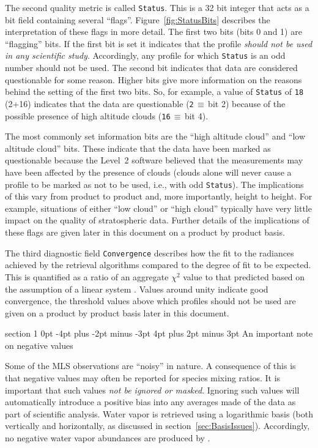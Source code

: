 \documentclass[11pt,draft]{report}
\makeatletter
\renewcommand{\section}{\@startsection%
  {section}%
  {1}%
  {0pt}%
  {-4pt plus -2pt minus -3pt}%
  {4pt plus 2pt minus 3pt}%
  {\Large\sffamily\fontseries{sb}\selectfont\flushleft\color{SectionColor}\figureversion{tabular}}}%
\makeatother
\begin{document}
The second quality metric is called \texttt{Status}.  This is a 32 bit
integer that acts as a bit field containing several ``flags''.
Figure~\ref{fig:StatusBits} describes the interpretation of these flags
in more detail.  The first two bits (bits 0 and 1) are ``flagging''
bits.  If the first bit is set it indicates that the profile
\emph{should not be used in any scientific study}.  Accordingly, any
profile for which \texttt{Status} is an odd number should not be used.
The second bit indicates that data are considered questionable for some
reason.  Higher bits give more information on the reasons behind the
setting of the first two bits.  So, for example, a value of
\texttt{Status} of \texttt{18} (2+16) indicates that the data are
questionable (\texttt{2}\,$\equiv$\,bit 2) because of the possible
presence of high altitude clouds (\texttt{16}\,$\equiv$\,bit 4).

The most commonly set information bits are the ``high altitude cloud''
and ``low altitude cloud'' bits.  These indicate that the data have been
marked as questionable because the Level~2 software believed that the
measurements may have been affected by the presence of clouds (clouds
alone will never cause a profile to be marked as not to be used, i.e.,
with odd \texttt{Status}).  The implications of this vary from product
to product and, more importantly, height to height.  For example,
situations of either ``low cloud'' or ``high cloud'' typically have very
little impact on the quality of stratospheric data.  Further details of
the implications of these flags are given later in this document on a
product by product basis.

The third diagnostic field \texttt{Convergence} describes how the fit to
the radiances achieved by the retrieval algorithms compared to the
degree of fit to be expected.  This is quantified as a ratio of an
aggregate $\chi^2$ value to that predicted based on the assumption of a
linear system \citep{LiveseyEtal06}.  Values around unity indicate good
convergence, the threshold values above which profiles should not be used
are given on a product by product basis later in this document.

\section{An important note on negative values}
\label{sec:NegativeValuesOK}

Some of the MLS observations are ``noisy'' in nature.  A consequence of
this is that negative values may often be reported for species mixing
ratios.  It is important that such values \emph{not be ignored or
  masked}.  Ignoring such values will automatically introduce a positive
bias into any averages made of the data as part of scientific analysis.
Water vapor is retrieved using a logarithmic basis (both vertically and
horizontally, as discussed in section~\ref{sec:BasisIssues}).
Accordingly, no negative water vapor abundances are produced by \thisv.
\end{document}
